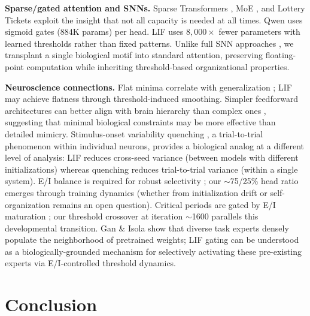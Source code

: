 \documentclass[11pt]{article}
\begin{document}
\textbf{Sparse/gated attention and SNNs.}
Sparse Transformers \cite{child2019generating}, MoE \cite{fedus2022switch}, and Lottery Tickets \cite{frankle2019lottery} exploit the insight that not all capacity is needed at all times. Qwen \cite{yang2025qwen3} uses sigmoid gates ($884$K params) per head. LIF uses $8{,}000\times$ fewer parameters with learned thresholds rather than fixed patterns. Unlike full SNN approaches \cite{maass1997networks,zhou2023spikformer,bellec2018long}, we transplant a single biological motif into standard attention, preserving floating-point computation while inheriting threshold-based organizational properties.

\textbf{Neuroscience connections.}
Flat minima correlate with generalization \cite{hochreiter1997flat,keskar2017large}; LIF may achieve flatness through threshold-induced smoothing. Simpler feedforward architectures can better align with brain hierarchy than complex ones \cite{nonaka2021brain}, suggesting that minimal biological constraints may be more effective than detailed mimicry. Stimulus-onset variability quenching \cite{churchland2010stimulus}, a trial-to-trial phenomenon within individual neurons, provides a biological analog at a different level of analysis: LIF reduces cross-seed variance (between models with different initializations) whereas quenching reduces trial-to-trial variance (within a single system). E/I balance is required for robust selectivity \cite{mackwood2021ei,rubin2017balanced,douglas2004neuronal}; our $\sim$75/25\% head ratio emerges through training dynamics (whether from initialization drift or self-organization remains an open question). Critical periods are gated by E/I maturation \cite{hensch2005critical,bengio2009curriculum}; our threshold crossover at iteration $\sim$1600 parallels this developmental transition. Gan \& Isola \cite{gan2026neural} show that diverse task experts densely populate the neighborhood of pretrained weights; LIF gating can be understood as a biologically-grounded mechanism for selectively activating these pre-existing experts via E/I-controlled threshold dynamics.


\section{Conclusion}
\end{document}
